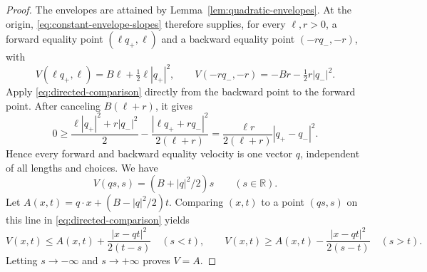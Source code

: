 \documentclass[11pt]{article}
\numberwithin{equation}{section}
\theoremstyle{definition}
\theoremstyle{remark}
\newcommand{\R}{\mathbb{R}}
\begin{document}
\begin{proof}
The envelopes are attained by Lemma~\ref{lem:quadratic-envelopes}. At the origin, \eqref{eq:constant-envelope-slopes} therefore supplies, for every $\ell,r>0$, a forward equality point $(\ell q_+,\ell)$ and a backward equality point $(-r q_-,-r)$, with
\[
  V(\ell q_+,\ell)=B\ell+\tfrac12\ell|q_+|^2,
  \qquad V(-r q_-,-r)=-Br-\tfrac12r|q_-|^2.
\]
Apply \eqref{eq:directed-comparison} directly from the backward point to the forward point. After canceling $B(\ell+r)$, it gives
\[
  0\ge \frac{\ell|q_+|^2+r|q_-|^2}{2}
       -\frac{|\ell q_++r q_-|^2}{2(\ell+r)}
    =\frac{\ell r}{2(\ell+r)}|q_+-q_-|^2.
\]
Hence every forward and backward equality velocity is one vector $q$, independent of all lengths and choices. We have
\[
  V(qs,s)=(B+|q|^2/2)s\qquad(s\in\R).
\]
Let $A(x,t)=q\cdot x+(B-|q|^2/2)t$. Comparing $(x,t)$ to a point $(qs,s)$ on this line in \eqref{eq:directed-comparison} yields
\[
  V(x,t)\le A(x,t)+\frac{|x-qt|^2}{2(t-s)}\quad(s<t),
  \qquad
  V(x,t)\ge A(x,t)-\frac{|x-qt|^2}{2(s-t)}\quad(s>t).
\]
Letting $s\to-\infty$ and $s\to+\infty$ proves $V=A$.
\end{proof}
\end{document}
